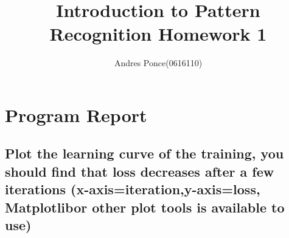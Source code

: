 \documentclass{article}
\title{Introduction to Pattern Recognition Homework 1}
\author{Andres Ponce(0616110)}
\begin{document}
\maketitle

\section{Program Report} %

		\subsection{Plot the learning curve of the training, you should 
				find that loss decreases after a few iterations 
				(x-axis=iteration,y-axis=loss, Matplotlibor other plot tools is available to use)}
\end{document}
